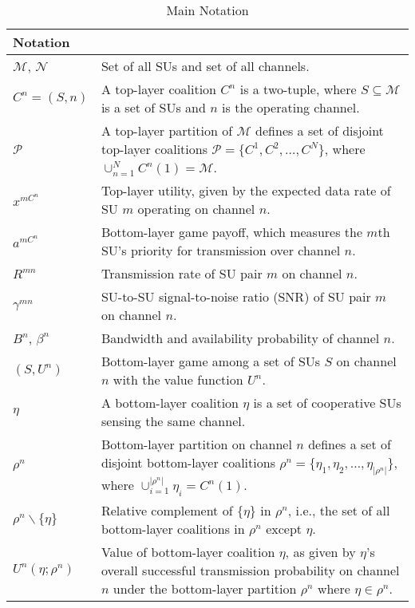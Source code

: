 \documentclass[journal,draftclsnofoot,onecolumn]{IEEEtran}
\theoremstyle{definition}
\def\TableOneShortWidth{0.61in}
\def\TableOneLongWidth{2.56in}
\def\Extra{0.5ex}
\def\TableOneShortWidth{0.7in}
\def\TableOneLongWidth{5.4in}
\def\Extra{0.5ex}
\begin{document}
\begin{table}[t]
\caption{Main Notation}  
\label{Table:Notation} 
\centering 
\begin{tabular}{@{\extracolsep{-\Extra}}|>{\centering\arraybackslash}m{\TableOneShortWidth}|>{\arraybackslash}m{\TableOneLongWidth}|}
\hline\hline 
\textbf{Notation} & \multicolumn{1}{c|}{\textbf{Explanation}}\\
\hline\hline
$\mathcal{M}$, $\mathcal{N}$ &  Set of all SUs and set of all channels. \\
\hline
$C^n=(S,n)$ & {A top-layer coalition $C^n$ is a two-tuple, where $S\subseteq\mathcal{M}$ is a set of SUs and $n$ is the operating channel. } \\ 
\hline
$\mathcal{P}$ &  {A top-layer partition of $\mathcal{M}$ defines a set of disjoint top-layer coalitions $\mathcal{P}=\{C^1,C^2, \ldots ,C^N\}$, where $\cup_{n=1}^NC^n(1)=\mathcal{M}$.}\\
\hline
$x^{mC^n}$ & {Top-layer utility, given by the expected data rate of SU $m$ operating on channel $n$.}\\
\hline
$a^{mC^n}$ & {Bottom-layer game payoff, which measures the $m$th SU's priority for transmission over channel $n$.}\\
\hline
$R^{mn}$ & {Transmission rate of SU pair $m$ on channel $n$.}\\ 
\hline
$\gamma^{mn}$ & {SU-to-SU signal-to-noise ratio (SNR) of SU pair $m$ on channel $n$.}\\
\hline
{$B^n$, $\beta^n$} & {Bandwidth and availability probability of channel $n$.}\\
\hline
$(S,U^n)$ & {Bottom-layer game among a set of SUs $S$ on channel $n$ with the value function $U^n$.} \\
\hline
$\eta$ & {A bottom-layer coalition $\eta$ is a set of cooperative SUs sensing the same channel}. \\
\hline
$\rho^n$ & {Bottom-layer partition on channel $n$ defines a set of disjoint bottom-layer coalitions $\rho^n=\{\eta_1,\eta_2,\ldots,\eta_{|\rho^n|}\}$, where $\cup_{i=1}^{|\rho^n|} \eta_i=C^n(1)$.} \\
\hline
$\rho^n\backslash\{\eta\}$ & Relative complement of $\{\eta\}$ in $\rho^n$, i.e., the set of all bottom-layer coalitions in $\rho^n$ except $\eta$. \\
\hline
$U^n(\eta;\rho^n)$ & Value of bottom-layer coalition $\eta$, as given by $\eta$'s overall successful transmission probability on channel $n$ under the bottom-layer partition $\rho^n$ where $\eta\in \rho^n$. \\

\end{tabular}
\end{table}
\end{document}
